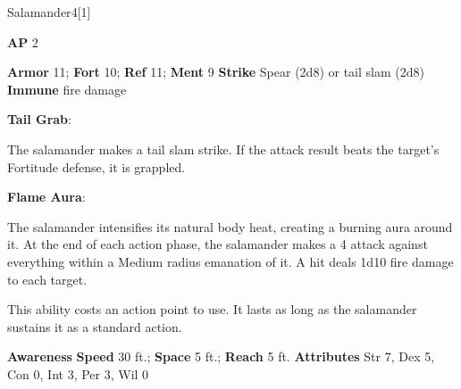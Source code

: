 \begin{monsection}[Flamebrother]{Salamander}{4}[1]
\vspace{-1em}\vspace{-1em}
\begin{spellcontent}
\begin{spelltargetinginfo}
{\textbf{AP} 2}

\pari \textbf{Armor} 11;
\textbf{Fort} 10;
\textbf{Ref} 11;
\textbf{Ment} 9
\pari \textbf{Strike} Spear  (2d8) or tail slam  (2d8)
\pari \textbf{Immune} fire damage


\end{spelltargetinginfo}


\begin{spelleffects}

\pari
\textbf{Tail Grab}:

The salamander makes a tail slam strike.
If the attack result beats the target's Fortitude defense, it is grappled.




\vspace{0.5em}
\pari
\textbf{Flame Aura}:

The salamander intensifies its natural body heat, creating a burning aura around it.
At the end of each action phase, the salamander makes a 4 attack
against everything within a Medium radius emanation of it.
A hit deals 1d10 fire damage to each target.

This ability costs an action point to use.
It lasts as long as the salamander sustains it as a standard action.




\end{spelleffects}

\end{spellcontent}

\begin{monsterfooter}
\pari \textbf{Awareness} 
\pari \textbf{Speed} 30 ft.;
\textbf{Space} 5 ft.;
\textbf{Reach} 5 ft.
\pari \textbf{Attributes}
Str 7,
Dex 5,
Con 0,
Int 3,
Per 3,
Wil 0
\end{monsterfooter}
\end{monsection}



